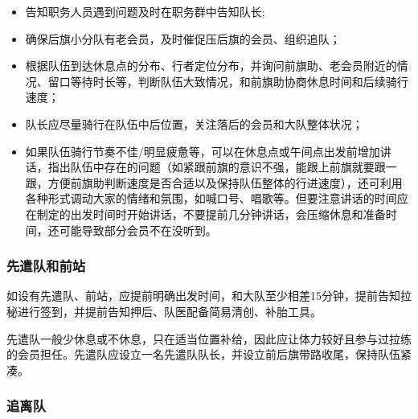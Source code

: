 \documentclass[UTF8]{ctexart}
\begin{document}
\begin{itemize}[nosep,left=2em]
    \item 告知职务人员遇到问题及时在职务群中告知队长;
    \item 确保后旗小分队有老会员，及时催促压后旗的会员、组织追队；
    \item 根据队伍到达休息点的分布、行者定位分布，并询问前旗助、老会员附近的情况、留口等待时长等，判断队伍大致情况，和前旗助协商休息时间和后续骑行速度；
    \item 队长应尽量骑行在队伍中后位置，关注落后的会员和大队整体状况；
    \item 如果队伍骑行节奏不佳/明显疲惫等，可以在休息点或午间点出发前增加讲话，指出队伍中存在的问题（如紧跟前旗的意识不强，能跟上前旗就要跟一跟，方便前旗助判断速度是否合适以及保持队伍整体的行进速度），还可利用各种形式调动大家的情绪和氛围，如喊口号、唱歌等。但要注意讲话的时间应在制定的出发时间时开始讲话，不要提前几分钟讲话，会压缩休息和准备时间，还可能导致部分会员不在没听到。
\end{itemize}

\subsubsection{先遣队和前站}

如设有先遣队、前站，应提前明确出发时间，和大队至少相差15分钟，提前告知拉秘进行签到，并提前告知押后、队医配备简易清创、补胎工具。

先遣队一般少休息或不休息，只在适当位置补给，因此应让体力较好且参与过拉练的会员担任。先遣队应设立一名先遣队队长，并设立前后旗带路收尾，保持队伍紧凑。

\subsubsection{追离队}
\end{document}
